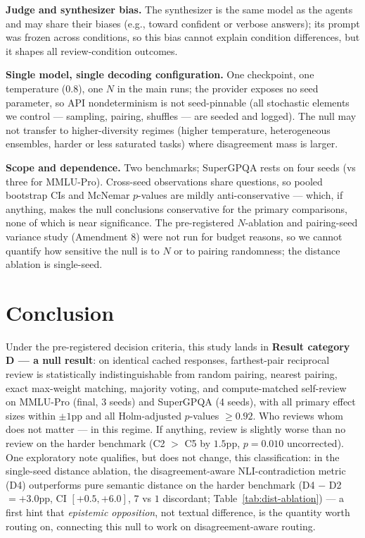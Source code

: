 \documentclass[11pt]{article}
\begin{document}
\textbf{Judge and synthesizer bias.} The synthesizer is the same model as the agents and may share their biases (e.g., toward confident or verbose answers); its prompt was frozen across conditions, so this bias cannot explain condition differences, but it shapes all review-condition outcomes.

\textbf{Single model, single decoding configuration.} One checkpoint, one temperature ($0.8$), one $N$ in the main runs; the provider exposes no seed parameter, so API nondeterminism is not seed-pinnable (all stochastic elements we control --- sampling, pairing, shuffles --- are seeded and logged). The null may not transfer to higher-diversity regimes (higher temperature, heterogeneous ensembles, harder or less saturated tasks) where disagreement mass is larger.

\textbf{Scope and dependence.} Two benchmarks; SuperGPQA rests on four seeds (vs three for MMLU-Pro). Cross-seed observations share questions, so pooled bootstrap CIs and McNemar $p$-values are mildly anti-conservative --- which, if anything, makes the null conclusions conservative for the primary comparisons, none of which is near significance. The pre-registered $N$-ablation and pairing-seed variance study (Amendment 8) were not run for budget reasons, so we cannot quantify how sensitive the null is to $N$ or to pairing randomness; the distance ablation is single-seed.

\section{Conclusion}
\label{sec:conclusion}

Under the pre-registered decision criteria, this study lands in \textbf{Result category D --- a null result}: on identical cached responses, farthest-pair reciprocal review is statistically indistinguishable from random pairing, nearest pairing, exact max-weight matching, majority voting, and compute-matched self-review on MMLU-Pro (final, 3 seeds) and SuperGPQA (4 seeds), with all primary effect sizes within $\pm 1$pp and all Holm-adjusted $p$-values $\geq 0.92$. Who reviews whom does not matter --- in this regime. If anything, review is slightly worse than no review on the harder benchmark (C2 $>$ C5 by $1.5$pp, $p=0.010$ uncorrected). One exploratory note qualifies, but does not change, this classification: in the single-seed distance ablation, the disagreement-aware NLI-contradiction metric (D4) outperforms pure semantic distance on the harder benchmark (D4 $-$ D2 $= +3.0$pp, CI $[+0.5, +6.0]$, $7$ vs $1$ discordant; Table~\ref{tab:dist-ablation}) --- a first hint that \emph{epistemic opposition}, not textual difference, is the quantity worth routing on, connecting this null to work on disagreement-aware routing.
\end{document}
